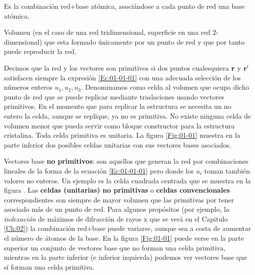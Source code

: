 \begin{definition}
    Es la combinación red+base atómica, asociándose a cada punto de red una base atómica. 
\end{definition}

\begin{definition}
	Volumen (en el caso de una red tridimensional, superficie en una red 2-dimensional) que esta formado únicamente por un punto de red y que por tanto puede reproducir la red.
\end{definition}

\begin{definition}
    Decimos que la red y los vectores son primitivos si dos puntos cualesquiera $\mathbf{r}$ y $\mathbf{r}'$ satisfacen siempre la expresión \ref{Ec:01-01-01} con una adecuada selección de los números enteros $u_1,u_2,u_3$. Denominamos como celda al volumen que ocupa dicho punto de red que se puede replicar mediante traslaciones usando vectores primitivos. En el momento que para replicar la estructura se necesita un no entero la celda, aunque se replique, ya no es primitiva. No existe ninguna celda de volumen menor que pueda servir como bloque constructor para la estructura cristalina. Toda celda primitiva es unitaria. La figura \ref{Fig:01-01} muestra en la parte inferior dos posibles celdas unitarias con sus vectores bases asociados.   
\end{definition}

\begin{definition}
    Vectores base {\bf no primitivos}: son aquellos que generan la red por combinaciones lineales de la forma de la ecuación \ref{Ec:01-01-01} pero donde los $u_i$ toman también valores no enteros. Un ejemplo es la celda cuadrada centrada que se muestra en la figura . Las \textbf{celdas (unitarias) no primitivas} o \textbf{celdas convencionales} correspondientes son siempre de mayor volumen que las primitivas por tener asociado más de un punto de red. Para algunos propósitos (por ejemplo, la {\it indexación} de máximos de difracción de rayos x que se verá en el Capitulo \ref{Ch:02}) la combinación red+base puede variarse, aunque sea a costa de aumentar el número de átomos de la base. En la figura \ref{Fig:01-01} puede verse en la parte superior un conjunto de vectores base que no forman una celda primitiva, mientras en la parte inferior (e inferior izquierda) podemos ver vectores base que sí forman una celda primitiva.
\end{definition}


